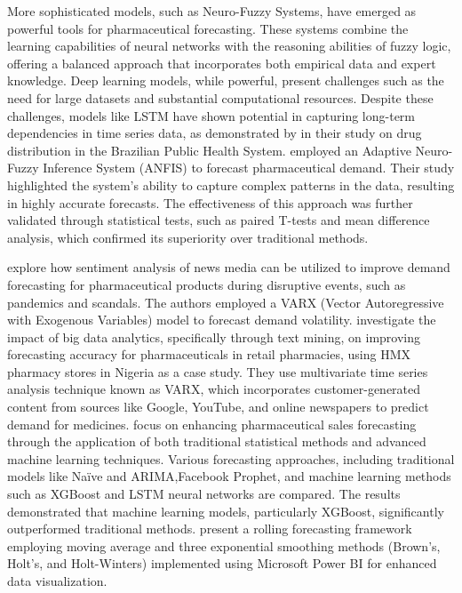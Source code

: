 \documentclass[
  authoryear,
  preprint,
  3p]{elsarticle}
\begin{document}
More sophisticated models, such as Neuro-Fuzzy Systems, have emerged as
powerful tools for pharmaceutical forecasting. These systems combine the
learning capabilities of neural networks with the reasoning abilities of
fuzzy logic, offering a balanced approach that incorporates both
empirical data and expert knowledge. Deep learning models, while
powerful, present challenges such as the need for large datasets and
substantial computational resources. Despite these challenges, models
like LSTM have shown potential in capturing long-term dependencies in
time series data, as demonstrated by \citet{sousa2019statistical} in
their study on drug distribution in the Brazilian Public Health System.
\citet{candan2014demand} employed an Adaptive Neuro-Fuzzy Inference
System (ANFIS) to forecast pharmaceutical demand. Their study
highlighted the system's ability to capture complex patterns in the
data, resulting in highly accurate forecasts. The effectiveness of this
approach was further validated through statistical tests, such as paired
T-tests and mean difference analysis, which confirmed its superiority
over traditional methods.

\citet{nguyen2023managing} explore how sentiment analysis of news media
can be utilized to improve demand forecasting for pharmaceutical
products during disruptive events, such as pandemics and scandals. The
authors employed a VARX (Vector Autoregressive with Exogenous Variables)
model to forecast demand volatility. \citet{papanagnou2018coping}
investigate the impact of big data analytics, specifically through text
mining, on improving forecasting accuracy for pharmaceuticals in retail
pharmacies, using HMX pharmacy stores in Nigeria as a case study. They
use multivariate time series analysis technique known as VARX, which
incorporates customer-generated content from sources like Google,
YouTube, and online newspapers to predict demand for medicines.
\citet{fourkiotis2024applying} focus on enhancing pharmaceutical sales
forecasting through the application of both traditional statistical
methods and advanced machine learning techniques. Various forecasting
approaches, including traditional models like Naïve and ARIMA,Facebook
Prophet, and machine learning methods such as XGBoost and LSTM neural
networks are compared. The results demonstrated that machine learning
models, particularly XGBoost, significantly outperformed traditional
methods. \citet{belghith2024new} present a rolling forecasting framework
employing moving average and three exponential smoothing methods
(Brown's, Holt's, and Holt-Winters) implemented using Microsoft Power BI
for enhanced data visualization.
\end{document}
